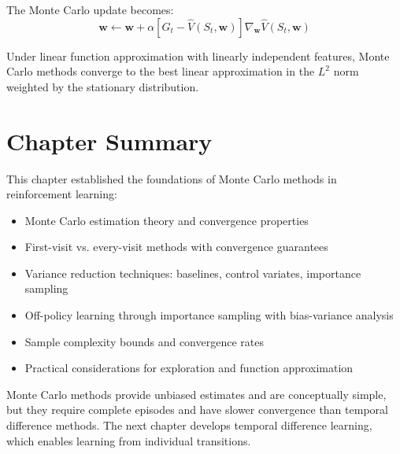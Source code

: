 The Monte Carlo update becomes:
\begin{equation}
\mathbf{w} \leftarrow \mathbf{w} + \alpha[G_t - \hat{V}(S_t, \mathbf{w})]\nabla_\mathbf{w} \hat{V}(S_t, \mathbf{w})
\end{equation}

\begin{theorem}
Under linear function approximation with linearly independent features, Monte Carlo methods converge to the best linear approximation in the $L^2$ norm weighted by the stationary distribution.
\end{theorem}

\section{Chapter Summary}

This chapter established the foundations of Monte Carlo methods in reinforcement learning:

\begin{itemize}
    \item Monte Carlo estimation theory and convergence properties
    \item First-visit vs. every-visit methods with convergence guarantees
    \item Variance reduction techniques: baselines, control variates, importance sampling
    \item Off-policy learning through importance sampling with bias-variance analysis
    \item Sample complexity bounds and convergence rates
    \item Practical considerations for exploration and function approximation
\end{itemize}

Monte Carlo methods provide unbiased estimates and are conceptually simple, but they require complete episodes and have slower convergence than temporal difference methods. The next chapter develops temporal difference learning, which enables learning from individual transitions.